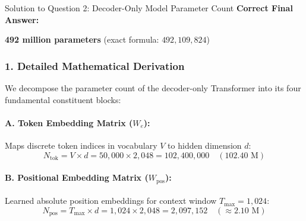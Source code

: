 \documentclass[11pt,a4paper]{article}
\begin{document}
\vspace{10pt}

\begin{solutionbox}{Solution to Question 2: Decoder-Only Model Parameter Count}
\textbf{Correct Final Answer:}
\begin{center}
\textbf{492 million parameters} (exact formula: $492{,}109{,}824$)
\end{center}

\subsubsection*{1. Detailed Mathematical Derivation}
We decompose the parameter count of the decoder-only Transformer into its four fundamental constituent blocks:

\paragraph{A. Token Embedding Matrix ($W_e$):}
Maps discrete token indices in vocabulary $V$ to hidden dimension $d$:
\begin{equation}
    N_{\text{tok}} = V \times d = 50{,}000 \times 2{,}048 = 102{,}400{,}000 \quad (102.40\text{ M})
\end{equation}

\paragraph{B. Positional Embedding Matrix ($W_{\text{pos}}$):}
Learned absolute position embeddings for context window $T_{\text{max}} = 1{,}024$:
\begin{equation}
    N_{\text{pos}} = T_{\text{max}} \times d = 1{,}024 \times 2{,}048 = 2{,}097{,}152 \quad (\approx 2.10\text{ M})
\end{equation}


\end{solutionbox}
\end{document}
